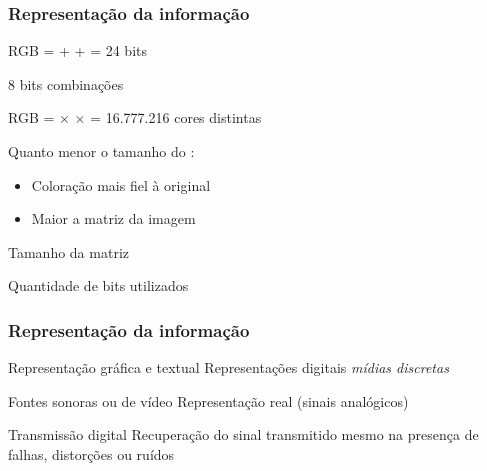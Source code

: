 \documentclass[xcolor]{beamer}
\begin{document}
\begin{frame}
    \frametitle{Representação da informação}

    \exemp
    {
        RGB = {\color{red!80!black}{8 bits}} + 
              {\color{green!80!black}{8 bits}} + 
              {\color{blue!80!black}{8 bits}} = 24 bits

        8 bits  combinações

        \vspace{0.25cm}

        RGB = {\color{red!80!black}{256}} $\times$
              {\color{green!80!black}{256}} $\times$ 
              {\color{blue!80!black}{256}} = 16.777.216 cores distintas
    }

    Quanto menor o tamanho do \pixel:

    \begin{itemize}
        \item Coloração mais fiel à original
        \item Maior a matriz da imagem
    \end{itemize}

    Tamanho da matriz 

    \vspace{0.25cm}

    Quantidade de bits utilizados 
    \vspace{0.25cm}
\end{frame}

\begin{frame}
    \frametitle{Representação da informação}

    Representação gráfica e textual \implica Representações digitais \implica
    {\it mídias discretas}

    \vspace{0.25cm}

    Fontes sonoras ou de vídeo \implica Representação real (sinais
    analógicos) 


    Transmissão digital \implica Recuperação do sinal transmitido mesmo na
    presença de falhas, distorções ou ruídos
\end{frame}
\end{document}
